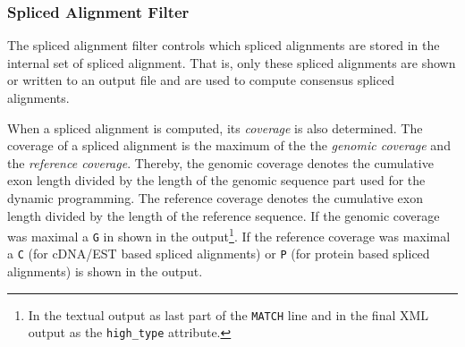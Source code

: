 \documentclass[11pt,a4paper,titlepage]{article}
\begin{document}
\begin{Justshowoptions}





\end{Justshowoptions}


\subsubsection{Spliced Alignment Filter}
\label{splicedalignmentfiltersection}

The spliced alignment filter controls which spliced alignments are stored in
the internal set of spliced alignment. That is, only these spliced alignments
are shown or written to an output file and are used to compute consensus
spliced alignments.

When a spliced alignment is computed, its  \emph{coverage} is
also determined. The coverage of a spliced alignment is the maximum of the
the \emph{genomic coverage} and the \emph{reference coverage}.
Thereby, the genomic coverage denotes the cumulative exon length divided by the
length of the genomic sequence part used for the dynamic programming. The
reference coverage denotes the cumulative exon length divided by the length of
the reference sequence. If the genomic coverage was maximal a \texttt{G} in
shown in the output\footnote{In the textual output as last part of the
\texttt{MATCH} line and in the final XML output as the \texttt{high\_type}
attribute.}. If the reference coverage was maximal a \texttt{C} (for
cDNA/EST based spliced alignments) or \texttt{P} (for protein based spliced
alignments) is shown in the output.
\end{document}
